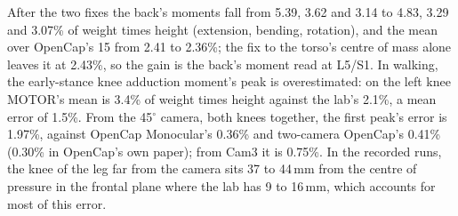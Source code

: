 \documentclass[11pt]{article}
\newcommand{\dg}{\ensuremath{^\circ}}
\begin{document}
After the two fixes the back's moments fall from 5.39, 3.62 and 3.14 to 4.83, 3.29 and 3.07\% of weight times height
(extension, bending, rotation), and the mean over OpenCap's 15 from 2.41 to 2.36\%; the fix to the torso's centre of
mass alone leaves it at 2.43\%, so the gain is the back's moment read at L5/S1.
In walking, the early-stance knee adduction moment's peak is overestimated: on the left knee MOTOR's mean is 3.4\%
of weight times height against the lab's 2.1\%, a mean error of 1.5\%. From the 45\dg{} camera, both knees together,
the first peak's error is 1.97\%, against OpenCap Monocular's 0.36\% and two-camera OpenCap's 0.41\% (0.30\% in
OpenCap's own paper); from Cam3 it is 0.75\%. In the
recorded runs, the knee of the leg far from the camera sits 37 to 44\,mm from the centre of pressure in the frontal
plane where the lab has 9 to 16\,mm, which accounts for most of this error.
\end{document}
